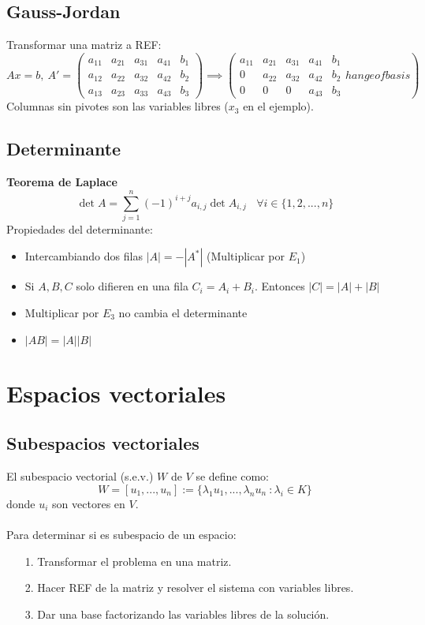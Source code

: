 \documentclass[12pt]{article}
\begin{document}
\subsection{Gauss-Jordan}
Transformar una matriz a REF:
\[Ax=b, \ A'=
\left(
\begin{array}{cccc|c}
a_{11} & a_{21} & a_{31} & a_{41} & b_1\\
a_{12} & a_{22} & a_{32} & a_{42} & b_2\\
a_{13} & a_{23} & a_{33} & a_{43} & b_3	
\end{array}
\right)
\implies
\left(
\begin{array}{cccc|c}
a_{11} & a_{21} & a_{31} & a_{41} & b_1\\
0 & a_{22} & a_{32} & a_{42} & b_2\\
0 & 0 & 0 & a_{43} & b_3
\end{array}hange of basis
\right)
\]
Columnas sin pivotes son las variables libres ($x_3$ en el ejemplo).

\subsection{Determinante}
\textbf{Teorema de Laplace}
\[\det{A}=\sum_{j=1}^{n}{(-1)^{i+j}a_{i,j} \det{A_{i,j}}} \ \ \ \ \forall i \in \{1, 2,...,n\}\]
Propiedades del determinante:
\begin{itemize}
	\item Intercambiando dos filas $|A|=-|A^*|$ (Multiplicar por $E_1$)
	\item Si $A, B, C$ solo difieren en una fila $C_i=A_i+B_i$. Entonces $|C|=|A|+|B|$
	\item Multiplicar por $E_3$ no cambia el determinante
	\item $|AB|=|A||B|$
\end{itemize}

\section{Espacios vectoriales}
	\subsection{Subespacios vectoriales}
	El subespacio vectorial (s.e.v.) $W$ de $V$ se define como:
	\[W=[u_1,...,u_n] :=\{\lambda_1u_1,...,\lambda_nu_n \ : \lambda_i\in K\}\]
	donde $u_i$ son vectores en $V$.\\ 
	\\
	Para determinar si es subespacio de un espacio:
	\begin{itemize}
		\item[1. ] Transformar el problema en una matriz.
		\item[2. ] Hacer REF de la matriz y resolver el sistema con variables libres.
		\item[3. ] Dar una base factorizando las variables libres de la solución.
	\end{itemize}
	
\end{document}
